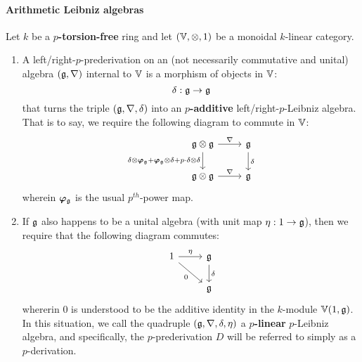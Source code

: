                 \paragraph{Arithmetic Leibniz algebras}
                    \begin{definition} \label{def: arithmetic_leibniz_algebras}
                        Let $k$ be a \textbf{$p$-torsion-free} ring and let $(\V, \tensor, 1)$ be a monoidal $k$-linear category. 
                            \begin{enumerate}
                                \item A left/right-$p$-prederivation on an (not necessarily commutative and unital) algebra $\left(\mathfrak{g}, \nabla\right)$ internal to $\mathbb{V}$ is a morphism of objects in $\mathbb{V}$:
                                    $$\delta: \mathfrak{g} \to \mathfrak{g}$$
                                that turns the triple $\left(\mathfrak{g}, \nabla, \delta\right)$ into an \textbf{$p$-additive} left/right-$p$-Leibniz algebra. That is to say, we require the following diagram to commute in $\mathbb{V}$:
                                    $$
                                        \begin{tikzcd}
                                        	{\g \tensor \g} & {\g} \\
                                        	{\g \tensor \g} & {\g}
                                        	\arrow["{\delta}", from=1-2, to=2-2]
                                        	\arrow["{\nabla}", from=2-1, to=2-2]
                                        	\arrow["{\nabla}", from=1-1, to=1-2]
                                        	\arrow["{\delta \tensor \Frob_{\g} + \Frob_{\g} \tensor \delta + p \cdot \delta \tensor \delta}"', from=1-1, to=2-1]
                                        \end{tikzcd}
                                    $$
                                wherein $\bm{\varphi}_{\mathfrak{g}}$ is the usual $p^{th}$-power map.
                                \item If $\mathfrak{g}$ also happens to be a unital algebra (with unit map $\eta: 1 \to \mathfrak{g}$), then we require that the following diagram commutes:
                                    $$
                                        \begin{tikzcd}
                                        	{1} & {\g} \\
                                        	& {\g}
                                        	\arrow["{\delta}", from=1-2, to=2-2]
                                        	\arrow["{\eta}", from=1-1, to=1-2]
                                        	\arrow["{0}"', from=1-1, to=2-2]
                                        \end{tikzcd}
                                    $$
                                whererin $0$ is understood to be the additive identity in the $k$-module $\mathbb{V}(1, \mathfrak{g})$. In this situation, we call the quadruple $(\mathfrak{g}, \nabla, \delta, \eta)$ a \textbf{$p$-linear} $p$-Leibniz algebra, and specifically, the $p$-prederivation $D$ will be referred to simply as a $p$-derivation.
                            \end{enumerate}
                    \end{definition}
